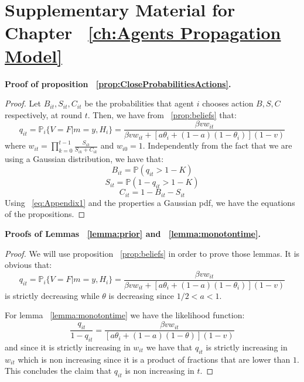 \chapter{Supplementary Material for Chapter ~\ref{ch:Agents Propagation Model}}
\label{app:AppendixA}

\textbf{Proof of proposition ~\ref{prop:CloseProbabilitiesActions}.}

\begin{proof}
	Let $B_{it}, S_{it}, C_{it}$ be the probabilities that agent $i$ chooses action $B,S,C$ respectively, at round $t$. Then, we have from ~\ref{prop:beliefs} that:
\begin{equation}
q_{it} = \mathbb{P}_i \{ V=F | m = y , H_i \} = \frac{\beta v w_{it}}{\beta v w_{it} + [a \theta_i + (1-a)(1-\theta_i)](1-v)}
\label{eq:Appendix1}
\end{equation}
where $w_{it} = \displaystyle\prod_{k=0}^{t-1} \frac{S_{ik}}{S_{ik}+C_{ik}}$ and $w_{i0} = 1$. Independently from the fact that we are using a Gaussian distribution, we have that:
	$$B_{it} = \mathbb{P} (q_{it}>1-K)$$
	$$S_{it} = \mathbb{P} (1-q_{it}>1-K)$$
	$$C_{it}= 1 - B_{it} - S_{it}$$
	Using ~\ref{eq:Appendix1} and the properties a Gaussian pdf, we have the equations of the propositions.
\end{proof}

\textbf{Proofs of Lemmas ~\ref{lemma:prior} and ~\ref{lemma:monotontime}.}

\begin{proof}
	We will use proposition ~\ref{prop:beliefs} in order to prove those lemmas. It is obvious that:
	$$q_{it} = \mathbb{P}_i \{ V=F | m = y , H_i \} = \frac{\beta v w_{it}}{\beta v w_{it} + [a \theta_i + (1-a)(1-\theta_i)](1-v)}$$ is strictly decreasing while $\theta$ is decreasing since $1/2<a<1$.
	
	For lemma ~\ref{lemma:monotontime} we have the likelihood function: $$\displaystyle{\frac{q_{it}}{1-q_{it}} = \frac{\beta v w_{it}}{[a\theta_i+(1-a)(1-\theta) ] (1-v) }}$$
	and since it is strictly increasing in $w_{it}$ we have that $q_{it}$ is strictly increasing in $w_{it}$ which is non increasing since it is a product of fractions that are lower than $1$. This concludes the claim that $q_{it}$ is non increasing in $t$.
\end{proof}